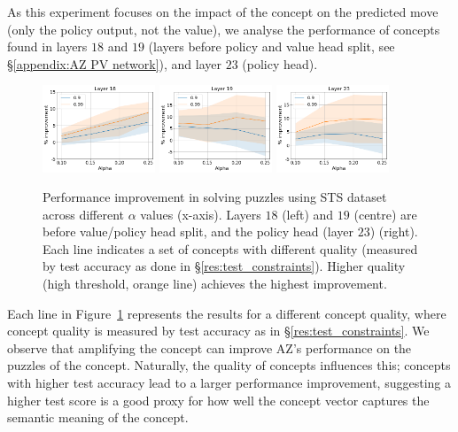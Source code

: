 \documentclass{article}
\begin{document}
As this experiment focuses on the impact of the concept on the predicted move (only the policy output, not the value),
we analyse the performance of concepts found in layers $18$ and $19$ (layers before policy and value head split, see \S\ref{appendix:AZ PV network}), and layer $23$ (policy head). 
\begin{figure}[ht] 
\centering
\caption{Performance improvement in solving puzzles using STS dataset across different $\alpha$ values (x-axis). Layers $18$ (left) and $19$ (centre) are before value/policy head split, and the policy head (layer $23$) (right). Each line indicates a set of concepts with different quality (measured by test accuracy as done in \S\ref{res:test_constraints}). Higher quality (high threshold, orange line) achieves the highest improvement.}
\includegraphics[width=0.3\textwidth]{images/l18.png}
\hspace{0.02\textwidth}
\includegraphics[width=0.3\textwidth]{images/l19.png}
\hspace{0.02\textwidth}
\includegraphics[width=0.3\textwidth]{images/l23.png}
\label{fig:amplification}
\end{figure}

Each line in Figure~\ref{fig:amplification} represents the results for a different concept quality, where concept quality is measured by test accuracy as in \S\ref{res:test_constraints}.
We observe that amplifying the concept can improve AZ's performance on the puzzles of the concept. Naturally, the quality of concepts influences this; 
concepts with higher test accuracy lead to a larger performance improvement, suggesting 
a higher test score is a good proxy for how well the concept vector captures the semantic meaning of the concept. 
\end{document}
